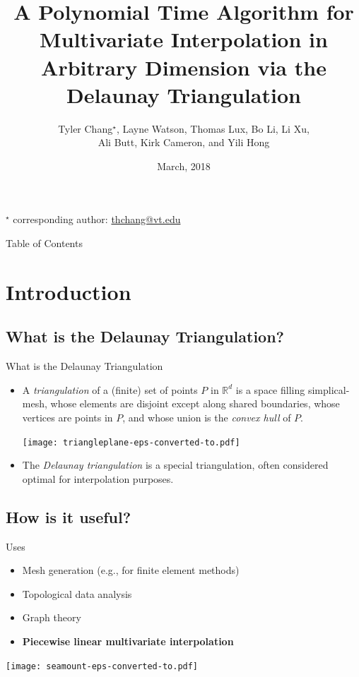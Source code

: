 \documentclass[xcolor=dvipsnames]{beamer}
\title{\bf A Polynomial Time Algorithm for Multivariate Interpolation
in Arbitrary Dimension via the Delaunay Triangulation}
\date{March, 2018}
\author{Tyler Chang$^\star$, Layne Watson, Thomas Lux, Bo Li, Li Xu,\\
Ali Butt, Kirk Cameron, and Yili Hong}
\institute{Virginia Polytechnic Institute and State University}
\begin{document}
\begin{frame}
\vfill
\titlepage
\vfill
{}$^\star$ corresponding author: \url{thchang@vt.edu}
\end{frame}

\begin{frame}{Table of Contents}
\tableofcontents
\end{frame}

\section{Introduction}
\subsection{What is the Delaunay Triangulation?}
\begin{frame}{What is the Delaunay Triangulation}
\begin{itemize}
\item A {\it triangulation} of a (finite) set of points $P$ in $\mathbb{R}^d$ 
is a space filling simplical-mesh, whose elements are disjoint except along
shared boundaries, whose vertices are points in $P$, and whose union is the 
{\it convex hull} of $P$.\\
\begin{center}
\texttt{[image: triangleplane-eps-converted-to.pdf]}
\end{center}
\item The {\it Delaunay triangulation} is a special triangulation, often
considered optimal for interpolation purposes.
\end{itemize}
\end{frame}
\subsection{How is it useful?}
\begin{frame}{Uses}
\begin{itemize}
\item Mesh generation (e.g., for finite element methods)
\item Topological data analysis
\item Graph theory
\pause
\item \textbf{Piecewise linear multivariate interpolation}
\end{itemize}
\begin{center}
\texttt{[image: seamount-eps-converted-to.pdf]}
\end{center}
\end{frame}
\end{document}
